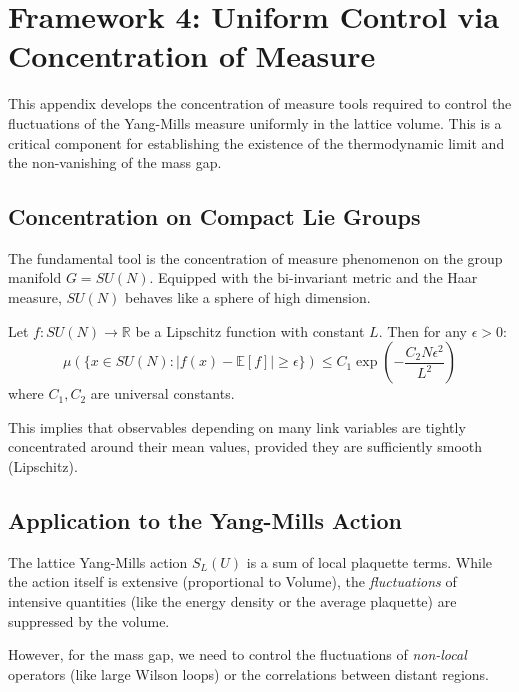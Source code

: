 \section{Framework 4: Uniform Control via Concentration of Measure}
\label{app:concentration_measure}

This appendix develops the concentration of measure tools required to control the fluctuations of the Yang-Mills measure uniformly in the lattice volume. This is a critical component for establishing the existence of the thermodynamic limit and the non-vanishing of the mass gap.

\subsection{Concentration on Compact Lie Groups}

The fundamental tool is the concentration of measure phenomenon on the group manifold $G = SU(N)$. Equipped with the bi-invariant metric and the Haar measure, $SU(N)$ behaves like a sphere of high dimension.

\begin{theorem}
Let $f: SU(N) \to \mathbb{R}$ be a Lipschitz function with constant $L$. Then for any $\epsilon > 0$:
\begin{equation}
\mu(\{ x \in SU(N) : |f(x) - \mathbb{E}[f]| \ge \epsilon \}) \le C_1 \exp\left( - \frac{C_2 N \epsilon^2}{L^2} \right)
\end{equation}
where $C_1, C_2$ are universal constants.
\end{theorem}

This implies that observables depending on many link variables are tightly concentrated around their mean values, provided they are sufficiently smooth (Lipschitz).

\subsection{Application to the Yang-Mills Action}

The lattice Yang-Mills action $S_L(U)$ is a sum of local plaquette terms. While the action itself is extensive (proportional to Volume), the \textit{fluctuations} of intensive quantities (like the energy density or the average plaquette) are suppressed by the volume.

However, for the mass gap, we need to control the fluctuations of \textit{non-local} operators (like large Wilson loops) or the correlations between distant regions.

